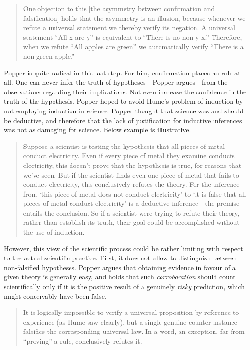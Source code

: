 \documentclass[
]{book}
\begin{document}
\begin{quote}
One objection to this {[}the asymmetry between confirmation and falsification{]} holds that the asymmetry is an illusion, because whenever we refute a universal statement we thereby verify its negation. A universal statement ``All x are y'' is equivalent to ``There is no non-y x.'' Therefore, when we refute ``All apples are green'' we automatically verify ``There is a non-green apple.'' --- \citep{percival2015confirmation}
\end{quote}

Popper is quite radical in this last step. For him, confirmation places no role at all. One can never infer the truth of hypotheses - Popper argues - from the observations regarding their implications. Not even increase the confidence in the truth of the hypothesis. Popper hoped to avoid Hume's problem of induction by not employing induction in science. Popper thought that science was and should be deductive, and therefore that the lack of justification for inductive inferences was not as damaging for science. Below example is illustrative.

\begin{quote}
Suppose a scientist is testing the hypothesis that all pieces of metal conduct electricity. Even if every piece of metal they examine conducts electricity, this doesn't prove that the hypothesis is true, for reasons that we've seen. But if the scientist finds even one piece of metal that fails to conduct electricity, this conclusively refutes the theory. For the inference from `this piece of metal does not conduct electricity' to `it is false that all pieces of metal conduct electricity' is a deductive inference---the premise entails the conclusion. So if a scientist were trying to refute their theory, rather than establish its truth, their goal could be accomplished without the use of induction. --- \citep{okasha-pos}
\end{quote}

However, this view of the scientific process could be rather limiting with respect to the actual scientific practice. First, it does not allow to distinguish between non-falsified hypotheses. Popper argues that obtaining evidence in favour of a given theory is generally easy, and holds that such \emph{corroboration} should count scientifically only if it is the positive result of a genuinely \emph{risky} prediction, which might conceivably have been false.

\begin{quote}
It is logically impossible to verify a universal proposition by reference to experience (as Hume saw clearly), but a single genuine counter-instance falsifies the corresponding universal law. In a word, an exception, far from ``proving'' a rule, conclusively refutes it. --- \citep{sep-popper}
\end{quote}
\end{document}

